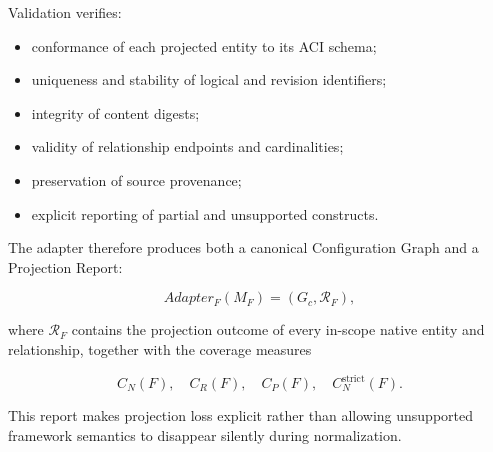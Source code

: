 \documentclass[10pt]{article}
\begin{document}
Validation verifies:

\begin{itemize}
	\item conformance of each projected entity to its ACI schema;
	\item uniqueness and stability of logical and revision identifiers;
	\item integrity of content digests;
	\item validity of relationship endpoints and cardinalities;
	\item preservation of source provenance;
	\item explicit reporting of partial and unsupported constructs.
\end{itemize}

The adapter therefore produces both a canonical Configuration Graph and a
Projection Report:

\begin{equation}
	Adapter_F(M_F)
	=
	(G_c,\mathcal{R}_F),
\end{equation}

where $\mathcal{R}_F$ contains the projection outcome of every in-scope native
entity and relationship, together with the coverage measures

\begin{equation}
	C_N(F),\quad
	C_R(F),\quad
	C_P(F),\quad
	C_N^{\mathrm{strict}}(F).
\end{equation}

This report makes projection loss explicit rather than allowing unsupported
framework semantics to disappear silently during normalization.	
	
	
\end{document}
